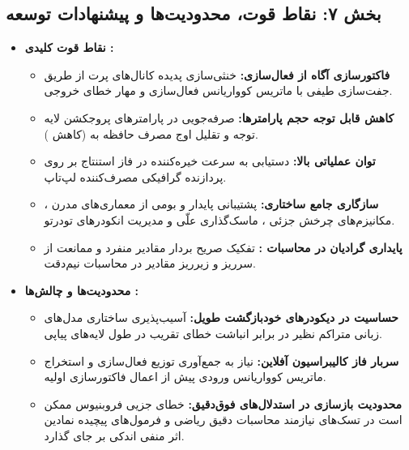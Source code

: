 \subsection*{بخش ۷: نقاط قوت، محدودیت‌ها و پیشنهادات توسعه }
\begin{itemize}
    \item \textbf{نقاط قوت کلیدی :}
    \begin{itemize}
        \item \textbf{فاکتورسازی آگاه از فعال‌سازی:} خنثی‌سازی پدیده کانال‌های پرت از طریق جفت‌سازی طیفی با ماتریس کوواریانس فعال‌سازی و مهار خطای خروجی.
        \item \textbf{کاهش قابل توجه حجم پارامترها:} صرفه‌جویی  در پارامترهای پروجکشن لایه توجه و تقلیل اوج مصرف حافظه به  (کاهش ).
        \item \textbf{توان عملیاتی بالا:} دستیابی به سرعت خیره‌کننده  در فاز استنتاج بر روی پردازنده گرافیکی مصرف‌کننده لپ‌تاپ.
        \item \textbf{سازگاری جامع ساختاری:} پشتیبانی پایدار و بومی از معماری‌های مدرن ، مکانیزم‌های چرخش جزئی ، ماسک‌گذاری علّی و مدیریت انکودرهای تودرتو.
        \item \textbf{پایداری گرادیان در محاسبات :} تفکیک صریح بردار مقادیر منفرد و ممانعت از سرریز و زیرریز مقادیر در محاسبات نیم‌دقت.
    \end{itemize}

    \item \textbf{محدودیت‌ها و چالش‌ها :}
    \begin{itemize}
        \item \textbf{حساسیت در دیکودرهای خودبازگشت طویل:} آسیب‌پذیری ساختاری مدل‌های زبانی متراکم نظیر  در برابر انباشت خطای تقریب در طول لایه‌های پیاپی.
        \item \textbf{سربار فاز کالیبراسیون آفلاین:} نیاز به جمع‌آوری توزیع فعال‌سازی و استخراج ماتریس کوواریانس ورودی پیش از اعمال فاکتورسازی اولیه.
        \item \textbf{محدودیت بازسازی در استدلال‌های فوق‌دقیق:} خطای جزیی فروبنیوس ممکن است در تسک‌های نیازمند محاسبات دقیق ریاضی و فرمول‌های پیچیده نمادین اثر منفی اندکی بر جای گذارد.
    \end{itemize}


\end{itemize}
